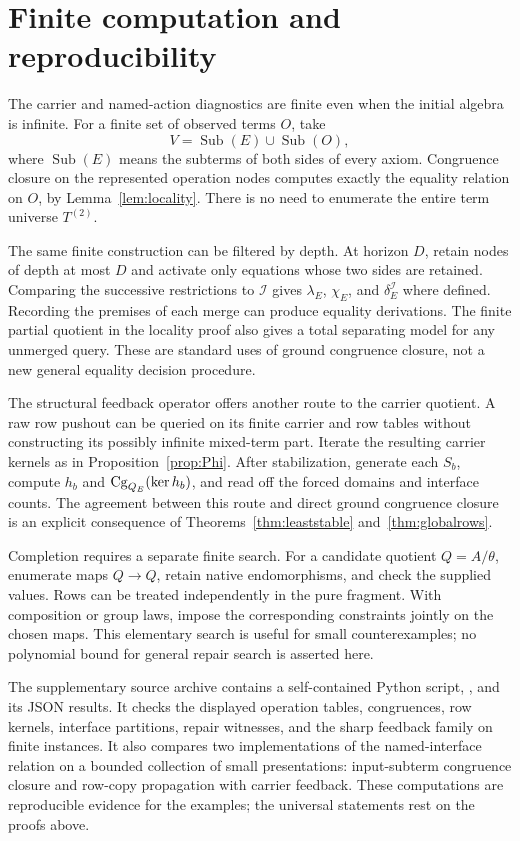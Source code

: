 \section{Finite computation and reproducibility}\label{sec:computation}

The carrier and named-action diagnostics are finite even when the initial
algebra is infinite. For a finite set of observed terms $O$, take
\[
V=\operatorname{Sub}(E)\cup\operatorname{Sub}(O),
\]
where $\operatorname{Sub}(E)$ means the subterms of both sides of every
axiom. Congruence closure on the represented operation nodes computes
exactly the equality relation on $O$, by Lemma~\ref{lem:locality}.
There is no need to enumerate the entire term universe $T^{(2)}$.

The same finite construction can be filtered by depth. At horizon $D$,
retain nodes of depth at most $D$ and activate only equations whose two
sides are retained. Comparing the successive restrictions to $\mathcal I$
gives $\lambda_E$, $\chi_E$, and $\delta_E^{\mathcal I}$ where defined.
Recording the premises of each merge can produce equality derivations.
The finite partial quotient in the locality proof also gives a total
separating model for any unmerged query. These are standard uses of ground
congruence closure, not a new general equality decision procedure.

The structural feedback operator offers another route to the carrier
quotient. A raw row pushout can be queried on its finite carrier and row
tables without constructing its possibly infinite mixed-term part.
Iterate the resulting carrier kernels as in Proposition~\ref{prop:Phi}.
After stabilization, generate each $S_b$, compute $h_b$ and
$\operatorname{Cg}_{Q_E}(\ker h_b)$, and read off the forced domains and interface counts.
The agreement between this route and direct ground congruence closure is
an explicit consequence of Theorems~\ref{thm:leaststable}
and~\ref{thm:globalrows}.

Completion requires a separate finite search. For a candidate quotient
$Q=A/\theta$, enumerate maps $Q\to Q$, retain native endomorphisms, and
check the supplied values. Rows can be treated independently in the pure
fragment. With composition or group laws, impose the corresponding
constraints jointly on the chosen maps. This elementary search is useful
for small counterexamples; no polynomial bound for general repair search
is asserted here.

The supplementary source archive contains a self-contained Python script,
, and its JSON results. It checks
the displayed operation tables, congruences, row kernels, interface
partitions, repair witnesses, and the sharp feedback family on finite
instances. It also compares two implementations of the named-interface
relation on a bounded collection of small presentations: input-subterm
congruence closure and row-copy propagation with carrier feedback.
These computations are reproducible evidence for the examples; the
universal statements rest on the proofs above.

